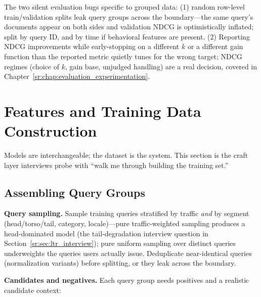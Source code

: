 \begin{warningbox}
The two silent evaluation bugs specific to grouped data: (1) random row-level train/validation splits leak query groups across the boundary---the same query's documents appear on both sides and validation NDCG is optimistically inflated; split by query ID, and by time if behavioral features are present. (2) Reporting NDCG improvements while early-stopping on a different $k$ or a different gain function than the reported metric quietly tunes for the wrong target; NDCG regimes (choice of $k$, gain base, unjudged handling) are a real decision, covered in Chapter~\ref{sr:chap:evaluation_experimentation}.
\end{warningbox}

\section{Features and Training Data Construction}
\label{sr:sec:ltr_data}

Models are interchangeable; the dataset is the system. This section is the craft layer interviews probe with ``walk me through building the training set.''

\subsection{Assembling Query Groups}

\textbf{Query sampling.} Sample training queries stratified by traffic \textit{and} by segment (head/torso/tail, category, locale)---pure traffic-weighted sampling produces a head-dominated model (the tail-degradation interview question in Section~\ref{sr:sec:ltr_interview}); pure uniform sampling over distinct queries underweights the queries users actually issue. Deduplicate near-identical queries (normalization variants) before splitting, or they leak across the boundary.

\textbf{Candidates and negatives.} Each query group needs positives and a realistic candidate context:

